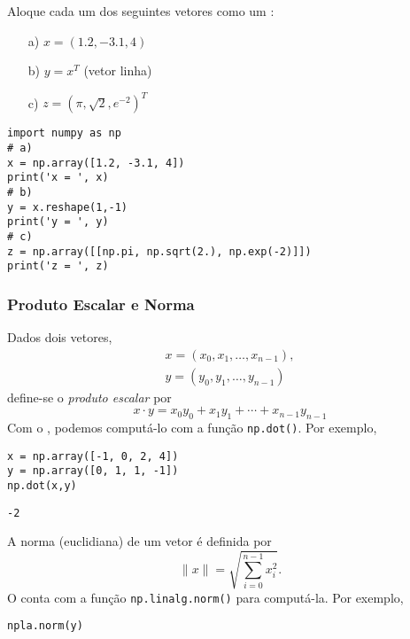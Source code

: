 \begin{exer}
  Aloque cada um dos seguintes vetores como um {\PYTHONnumpyDOTarray}:
  \begin{enumerate}
  \item[a)] $x = (1.2, -3.1, 4)$
  \item[b)] $y = x^T$ (vetor linha)
  \item[c)] $z = (\pi, \sqrt{2}, e^{-2})^T$
  \end{enumerate}
\end{exer}
\begin{resp}
  
\begin{lstlisting}
import numpy as np
# a)
x = np.array([1.2, -3.1, 4])
print('x = ', x)
# b)
y = x.reshape(1,-1)
print('y = ', y)
# c)
z = np.array([[np.pi, np.sqrt(2.), np.exp(-2)]])
print('z = ', z)
\end{lstlisting}
\end{resp}

\subsubsection{Produto Escalar e Norma}

Dados dois vetores,
\begin{gather}
  x = (x_0, x_1, \dotsc, x_{n-1}),\\
  y = (y_0, y_1, \dotsc, y_{n-1})
\end{gather}
define-se o \emph{produto escalar} por
\begin{equation}
  x\cdot y = x_0y_0 + x_1y_1 + \cdots + x_{n-1}y_{n-1}
\end{equation}
Com o {\numpy}, podemos computá-lo com a função \texttt{np.dot()}. Por exemplo,

\begin{lstlisting}
x = np.array([-1, 0, 2, 4])
y = np.array([0, 1, 1, -1])
np.dot(x,y)
\end{lstlisting}

\begin{verbatim}
-2
\end{verbatim}

A norma (euclidiana) de um vetor é definida por
\begin{equation}
  \|x\| = \sqrt{\sum_{i=0}^{n-1} x_i^2}.
\end{equation}
O {\numpy} conta com a função \texttt{np.linalg.norm()} para computá-la. Por exemplo,

\begin{lstlisting}
npla.norm(y)
\end{lstlisting}

